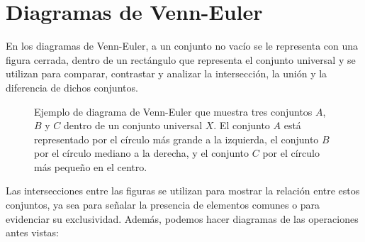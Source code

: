 \section{Diagramas de Venn-Euler}

En los diagramas de Venn-Euler, a un conjunto no vacío se le representa con una figura cerrada, dentro de un rectángulo que representa el conjunto universal y se utilizan para comparar, contrastar y analizar la intersección, la unión y la diferencia de dichos conjuntos.
\begin{figure}[h!]
    \centering
    \caption{Ejemplo de diagrama de Venn-Euler que muestra tres conjuntos $A$, $B$ y $C$ dentro de un conjunto universal $X$. El conjunto $A$ está representado por el círculo más grande a la izquierda, el conjunto $B$ por el círculo mediano a la derecha, y el conjunto $C$ por el círculo más pequeño en el centro.}
\end{figure}

\newpage

Las intersecciones entre las figuras se utilizan para mostrar la relación entre estos conjuntos, ya sea para señalar la presencia de elementos comunes o para evidenciar su exclusividad. Además, podemos hacer diagramas de las operaciones antes vistas:
\def\firstcircle{(0,0) circle (1.5cm)}
\def\secondcircle{(0:2cm) circle (1.5cm)}



